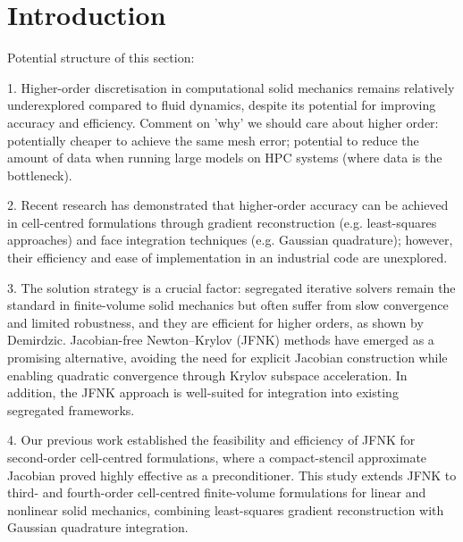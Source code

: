 \documentclass[sn-mathphys,Numbered]{sn-jnl}%
\begin{document}

\maketitle


\section{Introduction}\label{sec:intro}
%
Potential structure of this section:

	1.	Higher-order discretisation in computational solid mechanics remains relatively underexplored compared to fluid dynamics, despite its potential for improving accuracy and efficiency. Comment on 'why' we should care about higher order: potentially cheaper to achieve the same mesh error; potential to reduce the amount of data when running large models on HPC systems (where data is the bottleneck).

	2.	Recent research has demonstrated that higher-order accuracy can be achieved in cell-centred formulations through gradient reconstruction (e.g. least-squares approaches) and face integration techniques (e.g. Gaussian quadrature); however, their efficiency and ease of implementation in an industrial code are unexplored.

	3.	The solution strategy is a crucial factor: segregated iterative solvers remain the standard in finite-volume solid mechanics but often suffer from slow convergence and limited robustness, and they are efficient for higher orders, as shown by Demirdzic.
	Jacobian-free Newton–Krylov (JFNK) methods have emerged as a promising alternative, avoiding the need for explicit Jacobian construction while enabling quadratic convergence through Krylov subspace acceleration.
	In addition, the JFNK approach is well-suited for integration into existing segregated frameworks.

	4.	Our previous work established the feasibility and efficiency of JFNK for second-order cell-centred formulations, where a compact-stencil approximate Jacobian proved highly effective as a preconditioner.
	This study extends JFNK to third- and fourth-order cell-centred finite-volume formulations for linear and nonlinear solid mechanics, combining least-squares gradient reconstruction with Gaussian quadrature integration.
\end{document}
